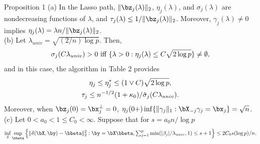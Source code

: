 \begin{frame}
\begin{block}{Proposition 1}
\scriptsize
(a) In the Lasso path, $\|\bz_j(\lambda)\|_2$, $\eta_j(\lambda)$, and $\sigma_j(\lambda)$
are nondecreasing functions of $\lambda$, and $\tau_j(\lambda)\le 1/\|\bz_j(\lambda)\|_2$. Moreover,
$\gamma_j(\lambda)\neq 0$ implies $\eta_j(\lambda)=\lambda n/\|\bz_j(\lambda)\|_2$. \\

(b) Let $\lambda_{univ}=\sqrt{(2/n)\log p}$. Then,
\begin{equation}
\setlength{\abovedisplayskip}{3pt} %
\setlength{\belowdisplayskip}{3pt}
\sigma_j(C\lambda_{univ})>0 \hbox{ iff } \{\lambda>0: \eta_j(\lambda) \le C\sqrt{2\log p}\}\neq \emptyset,
\end{equation}
    and in this case, the algorithm in Table 2 provides
\begin{gather}
\setlength{\abovedisplayskip}{3pt} %
\setlength{\belowdisplayskip}{3pt}
\eta_{j}\leq \eta_j^*\le (1\vee C)\sqrt{2\log p},\\
\tau_j\le n^{-1/2}(1+\kappa_0)/\hat{\sigma}_j(C\lambda_{univ}).
\end{gather}
    Moreover, when $\bz_j(0)=\bx_j^\perp =0$, $\eta_j(0+) \inf\{\|\gamma_j\|_1: \bX_{-j}\gamma_j=\bx_j\}=\sqrt{n}$.\\
(c) Let $0<a_0<1\leq C_0<\infty$. Suppose that for $s=a_0n/\log p$
\begin{equation*}
\setlength{\abovedisplayskip}{3pt} %
\setlength{\belowdisplayskip}{3pt}
\inf_{\delta}\sup_{\bbeta}\Big\{\|\delta(\bX,\by) - \bbeta\|_2^2: \by=\bX\bbeta,
\hbox{$\sum_{j=1}^p$} \min(|\beta_j|/\lambda_{univ},1)\le s+1 \Big\}\le 2C_0s(\log p)/n.
\end{equation*}
\end{block}
\end{frame}


